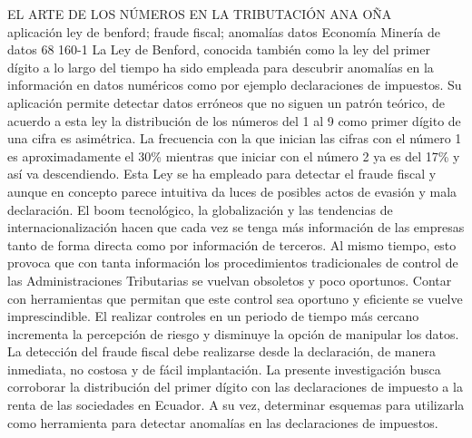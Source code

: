 \A
{EL ARTE DE LOS NÚMEROS EN LA TRIBUTACIÓN}
{ANA OÑA}
{
\\
}
{aplicación ley de benford; fraude fiscal; anomalías datos} 
 {Economía} 
 {Minería de datos} 
 {68} 
 {160-1}
{La Ley de Benford, conocida también como la ley del primer dígito a lo largo del tiempo ha sido empleada para descubrir anomalías en la información en datos numéricos como por ejemplo declaraciones de impuestos. Su aplicación permite detectar datos erróneos que no siguen un patrón teórico, de acuerdo a esta ley la distribución de los números del 1 al 9 como primer dígito de una cifra es asimétrica. La frecuencia con la que inician las cifras con el número 1 es aproximadamente el 30\% mientras que iniciar con el número 2 ya es del 17\% y así va descendiendo. Esta Ley se ha empleado para detectar el fraude fiscal y aunque en concepto parece intuitiva da luces de posibles actos de evasión y mala declaración. El boom tecnológico, la globalización y las tendencias de internacionalización hacen que cada vez se tenga más información de las empresas tanto de forma directa como por información de terceros. Al mismo tiempo, esto provoca que con tanta información los procedimientos tradicionales de control de las Administraciones Tributarias se vuelvan obsoletos y poco oportunos. Contar con herramientas que permitan que este control sea oportuno y eficiente se vuelve imprescindible. El realizar controles en un periodo de tiempo más cercano incrementa la percepción de riesgo y disminuye la opción de manipular los datos. La detección del fraude fiscal debe realizarse desde la declaración, de manera inmediata, no costosa y de fácil implantación. La presente investigación busca corroborar la distribución del primer dígito con las declaraciones de impuesto a la renta de las sociedades en Ecuador. A su vez, determinar esquemas para utilizarla como herramienta para detectar anomalías en las declaraciones de impuestos.}
